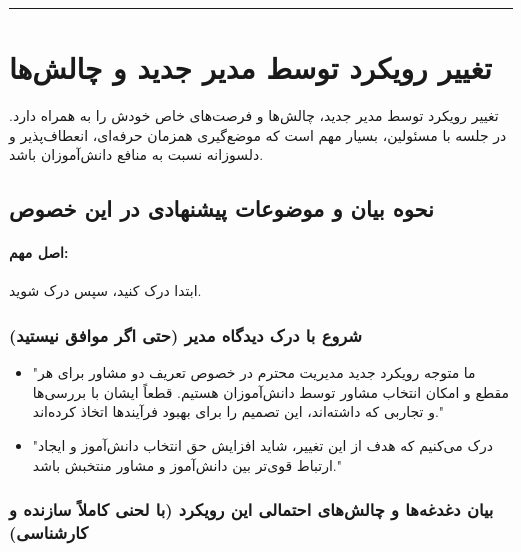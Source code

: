 \documentclass[12pt]{article}
\begin{document}
\bigskip
\begin{center}
    \rule{0.8\textwidth}{0.4pt}
\end{center}
\bigskip

\section*{تغییر رویکرد توسط مدیر جدید و چالش‌ها}
\noindent
تغییر رویکرد توسط مدیر جدید، چالش‌ها و فرصت‌های خاص خودش را به همراه دارد. در جلسه با مسئولین، بسیار مهم است که موضع‌گیری همزمان حرفه‌ای، انعطاف‌پذیر و دلسوزانه نسبت به منافع دانش‌آموزان باشد.

\subsection*{نحوه بیان و موضوعات پیشنهادی در این خصوص}

\paragraph{اصل مهم:} ابتدا درک کنید، سپس درک شوید.

\subsubsection*{شروع با درک دیدگاه مدیر (حتی اگر موافق نیستید)}
\begin{itemize}
    \item "ما متوجه رویکرد جدید مدیریت محترم در خصوص تعریف دو مشاور برای هر مقطع و امکان انتخاب مشاور توسط دانش‌آموزان هستیم. قطعاً ایشان با بررسی‌ها و تجاربی که داشته‌اند، این تصمیم را برای بهبود فرآیندها اتخاذ کرده‌اند."
    \item "درک می‌کنیم که هدف از این تغییر، شاید افزایش حق انتخاب دانش‌آموز و ایجاد ارتباط قوی‌تر بین دانش‌آموز و مشاور منتخبش باشد."
\end{itemize}

\subsubsection*{بیان دغدغه‌ها و چالش‌های احتمالی این رویکرد (با لحنی کاملاً سازنده و کارشناسی)}
\end{document}
